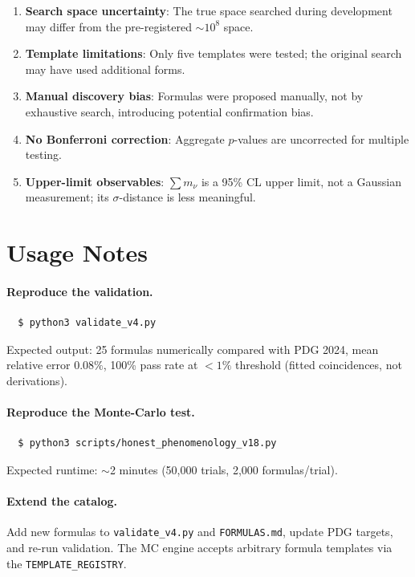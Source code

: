 \documentclass[11pt,a4paper]{article}
\begin{document}
\begin{enumerate}
  \item \textbf{Search space uncertainty}: The true space searched during
    development may differ from the pre-registered $\sim$$10^{8}$ space.
  \item \textbf{Template limitations}: Only five templates were tested;
    the original search may have used additional forms.
  \item \textbf{Manual discovery bias}: Formulas were proposed manually,
    not by exhaustive search, introducing potential confirmation bias.
  \item \textbf{No Bonferroni correction}: Aggregate $p$-values are
    uncorrected for multiple testing.
  \item \textbf{Upper-limit observables}: $\sum m_{\nu}$ is a 95\% CL
    upper limit, not a Gaussian measurement; its $\sigma$-distance is
    less meaningful.
\end{enumerate}

\section{Usage Notes}

\paragraph{Reproduce the validation.}
\begin{verbatim}
  $ python3 validate_v4.py
\end{verbatim}
Expected output: 25 formulas numerically compared with PDG 2024, mean relative error $0.08\%$,
100\% pass rate at $<1\%$ threshold (fitted coincidences, not derivations).

\paragraph{Reproduce the Monte-Carlo test.}
\begin{verbatim}
  $ python3 scripts/honest_phenomenology_v18.py
\end{verbatim}
Expected runtime: $\sim$2 minutes (50,000 trials, 2,000 formulas/trial).

\paragraph{Extend the catalog.}
Add new formulas to \texttt{validate\_v4.py} and \texttt{FORMULAS.md},
update PDG targets, and re-run validation.  The MC engine accepts
arbitrary formula templates via the \texttt{TEMPLATE\_REGISTRY}.
\end{document}
